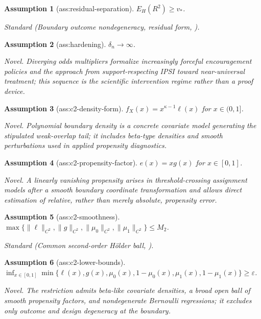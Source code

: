 \documentclass{article}
\newtheorem{assumption}{Assumption}
\begin{document}
\begin{assumption}[ass:residual-separation]\label{ass:residual-separation}
\(E_H(R^2)\geq v_*\).
\par\smallskip\noindent\emph{Standard} (Boundary outcome nondegeneracy, residual form, \cite{MaWang2020RobustIPW}).
\end{assumption}

\begin{assumption}[ass:hardening]\label{ass:hardening}
\(\delta_n\to\infty\).
\par\smallskip\noindent\emph{Novel.} Diverging odds multipliers formalize increasingly forceful encouragement policies and the approach from support-respecting IPSI toward near-universal treatment; this sequence is the scientific intervention regime rather than a proof device.
\end{assumption}

\begin{assumption}[ass:c2-density-form]\label{ass:c2-density-form}
\(f_X(x)=x^{\kappa-1}\ell(x)\) for \(x\in(0,1]\).
\par\smallskip\noindent\emph{Novel.} Polynomial boundary density is a concrete covariate model generating the stipulated weak-overlap tail; it includes beta-type densities and smooth perturbations used in applied propensity diagnostics.
\end{assumption}

\begin{assumption}[ass:c2-propensity-factor]\label{ass:c2-propensity-factor}
\(e(x)=xg(x)\) for \(x\in[0,1]\).
\par\smallskip\noindent\emph{Novel.} A linearly vanishing propensity arises in threshold-crossing assignment models after a smooth boundary coordinate transformation and allows direct estimation of relative, rather than merely absolute, propensity error.
\end{assumption}

\begin{assumption}[ass:c2-smoothness]\label{ass:c2-smoothness}
\(\max\{\|\ell\|_{C^2},\|g\|_{C^2},\|\mu_0\|_{C^2},\|\mu_1\|_{C^2}\}\leq M_2\).
\par\smallskip\noindent\emph{Standard} (Common second-order Hölder ball, \cite{HiranoImbensRidder2003}).
\end{assumption}

\begin{assumption}[ass:c2-lower-bounds]\label{ass:c2-lower-bounds}
\(\inf_{x\in[0,1]}\min\{\ell(x),g(x),\mu_0(x),1-\mu_0(x),\mu_1(x),1-\mu_1(x)\}\geq\varepsilon\).
\par\smallskip\noindent\emph{Novel.} The restriction admits beta-like covariate densities, a broad open ball of smooth propensity factors, and nondegenerate Bernoulli regressions; it excludes only outcome and design degeneracy at the boundary.
\end{assumption}
\end{document}
